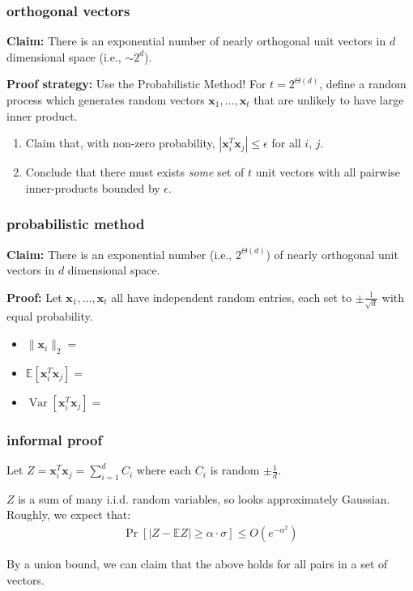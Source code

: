 \documentclass[compress]{beamer}
\newcommand{\bv}[1]{\mathbf{#1}}
\newcommand{\E}{\mathbb{E}}
\DeclareMathOperator{\Var}{Var}
\begin{document}
\begin{frame}[t]
	\frametitle{orthogonal vectors}
		\textbf{Claim:} There is an exponential number of nearly orthogonal unit vectors in $d$ dimensional space  (i.e., $\sim 2^d$).
		
		\textbf{Proof strategy:} Use the \alert{Probabilistic Method}! For $t =  2^{\Theta(d)}$, define a random process which generates random vectors $\bv{x}_1, \ldots, \bv{x}_t$ that are unlikely to have large inner product.
		\begin{enumerate}
			\item Claim that, with non-zero probability, $|\bv{x}_i^T\bv{x}_j| \leq \epsilon$ for all $i$, $j$.
			
			\item Conclude that there must exists \emph{some} set of $t$ unit vectors with all pairwise inner-products  bounded by $\epsilon$. 
		\end{enumerate}
\end{frame}


\begin{frame}[t]
	\frametitle{probabilistic method}
	\textbf{Claim:} There is an exponential number (i.e., $ 2^{\Theta(d)}$) of nearly orthogonal unit vectors in $d$ dimensional space.
	
	\textbf{Proof:} Let $\bv{x}_1, \ldots, \bv{x}_t$ all have independent random entries, each set to $\pm \frac{1}{\sqrt{d}}$ with equal probability. 
	\begin{itemize}
		\item $\|\bv{x}_i\|_2 = $
		\vspace{2em}
		\item $\E[\bv{x}_i^T\bv{x}_j]=$
		\vspace{2em}
		\item $\Var[\bv{x}_i^T\bv{x}_j]=$
	\end{itemize}
\end{frame}

\begin{frame}[t]
	\frametitle{informal proof}
	Let $Z = \bv{x}_i^T\bv{x}_j = \sum_{i=1}^d C_i$ where each $C_i$ is random $\pm \frac{1}{d}$.
	
	
	$Z$ is a sum of many i.i.d. random variables, so looks approximately Gaussian. Roughly, we expect that:
	\begin{align*}
		\Pr[|Z - \E Z| \geq \alpha\cdot \sigma] \leq O(e^{-\alpha^2})
	\end{align*}
\vspace{8em}

By a union bound, we can claim that the above holds for all pairs in a set of \hspace{5em} vectors.
\end{frame}
\end{document}
